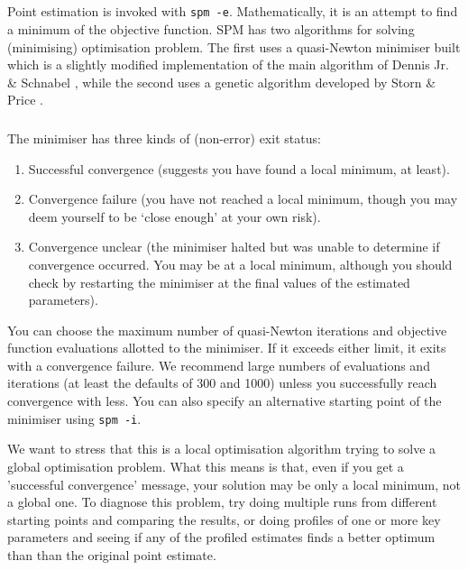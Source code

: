 \subsection{\label{sec:estimate-MPD}}

Point estimation is invoked with \texttt{spm -e}. Mathematically, it is an attempt to find a minimum of the objective function. SPM has two algorithms for solving (minimising) optimisation problem. The first uses a quasi-Newton minimiser built which is a slightly modified implementation of the main algorithm of Dennis Jr. \& Schnabel \citep{779}, while the second uses a genetic algorithm developed by Storn \& Price \citep{1442}.

\subsubsection{}

The minimiser has three kinds of (non-error) exit status: 

\begin{enumerate}
\item Successful convergence (suggests you have found a local minimum, at least).
\item Convergence failure (you have not reached a local minimum, though you may deem yourself to be `close enough' at your own risk).
\item Convergence unclear (the minimiser halted but was unable to determine if convergence occurred. You may be at a local minimum, although you should check by restarting the minimiser at the final values of the estimated parameters).
\end{enumerate}

You can choose the maximum number of quasi-Newton iterations and objective function evaluations allotted to the minimiser. If it exceeds either limit, it exits with a convergence failure. We recommend large numbers of evaluations and iterations (at least the defaults of 300 and 1000) unless you successfully reach convergence with less. You can also specify an alternative starting point of the minimiser using \texttt{spm -i}.

We want to stress that this is a local optimisation algorithm trying to solve a global optimisation problem. What this means is that, even if you get a 'successful convergence' message, your solution may be only a local minimum, not a global one. To diagnose this problem, try doing multiple runs from different starting points and comparing the results, or doing profiles of one or more key parameters and seeing if any of the profiled estimates finds a better optimum than than the original point estimate.

